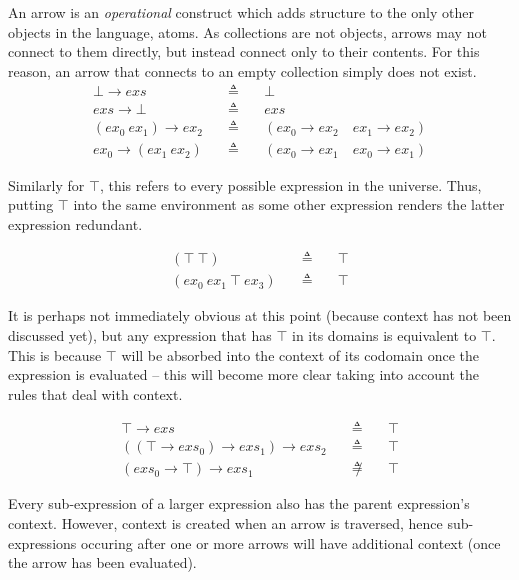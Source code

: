 \documentclass[a4paper,11pt]{article}
\begin{document}
An arrow is an \emph{operational} construct which adds structure to the only other objects in the language, atoms.
As collections are not objects, arrows may not connect to them directly, but instead connect only to their contents.
For this reason, an arrow that connects to an empty collection simply does not exist.
\begin{eqnarray*}
\bot \rightarrow exs \quad&\triangleq&\quad \bot \\
exs \rightarrow \bot \quad&\triangleq&\quad exs \\
(ex_0\ ex_1) \rightarrow ex_2 \quad&\triangleq&\quad (ex_0 \rightarrow ex_2 \quad ex_1 \rightarrow ex_2) \\
ex_0 \rightarrow (ex_1\ ex_2) \quad&\triangleq&\quad (ex_0 \rightarrow ex_1 \quad ex_0 \rightarrow ex_1)
\end{eqnarray*}

Similarly for $\top$, this refers to every possible expression in the universe.
Thus, putting $\top$ into the same environment as some other expression renders the latter expression redundant.

\begin{eqnarray*}
(\top\ \top) \quad&\triangleq&\quad \top \\
(ex_0\ ex_1\ \top\ ex_3) \quad&\triangleq&\quad \top
\end{eqnarray*}

It is perhaps not immediately obvious at this point (because context has not been discussed yet), but any expression that has $\top$ in its domains is equivalent to $\top$.
This is because $\top$ will be absorbed into the context of its codomain once the expression is evaluated -- this will become more clear taking into account the rules that deal with context.

\begin{eqnarray*}
\top \rightarrow exs \quad&\triangleq&\quad \top \\
((\top \rightarrow exs_0) \rightarrow exs_1) \rightarrow exs_2 \quad&\triangleq&\quad \top \\
(exs_0 \rightarrow \top) \rightarrow exs_1 \quad&\not\triangleq&\quad \top
\end{eqnarray*}

Every sub-expression of a larger expression also has the parent expression's context.
However, context is created when an arrow is traversed, hence sub-expressions occuring after one or more arrows will have additional context (once the arrow has been evaluated).
\end{document}

